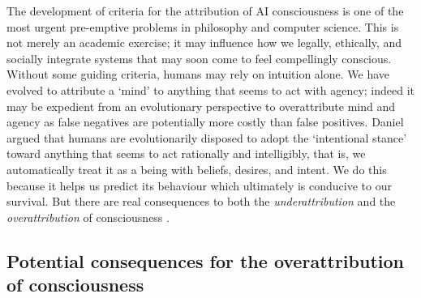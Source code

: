 \documentclass[11pt, a4paper, onecolumn, gdm]{google}
\begin{document}
The development of criteria for the attribution of AI consciousness is one of the most urgent pre-emptive problems in philosophy and computer science.
This is not merely an academic exercise; it may influence how we legally, ethically, and socially integrate systems that may soon come to feel compellingly conscious.
Without some guiding criteria, humans may rely on intuition alone.
We have evolved to attribute a `mind' to anything that seems to act with agency; indeed it may be expedient from an evolutionary perspective to overattribute mind and agency as false negatives are potentially more costly than false positives.
Daniel \citet{dennett1987} argued that humans are evolutionarily disposed to adopt the `intentional stance' toward anything that seems to act rationally and intelligibly, that is, we automatically treat it as a being with beliefs, desires, and intent.
We do this because it helps us predict its behaviour which ultimately is conducive to our survival.
But there are real consequences to both the \emph{underattribution} and the \emph{overattribution} of consciousness \citep{basl2014,schwitzgebel2023,birch2025,bekkers2026}.

\subsection{Potential consequences for the overattribution of consciousness}\label{potential-consequences-for-the-overattribution-of-consciousness}
\end{document}
